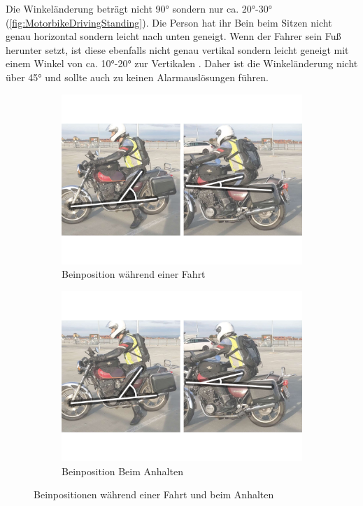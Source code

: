 Die Winkeländerung beträgt nicht \ang{90} sondern nur ca. \ang{20}-\ang{30} (\autoref{fig:MotorbikeDrivingStanding}). Die Person hat ihr Bein beim Sitzen nicht genau horizontal sondern leicht nach unten geneigt. Wenn der Fahrer sein Fuß herunter setzt, ist diese ebenfalls nicht genau vertikal sondern leicht geneigt mit einem Winkel von ca. \ang{10}-\ang{20} zur Vertikalen . Daher ist die Winkeländerung nicht über \ang{45} und sollte auch zu keinen Alarmauslösungen führen.

\begin{figure}
	\centering
	\begin{subfigure}{0.48\textwidth}
		\centering
		\includegraphics[width=\textwidth]{Bilder/0_Beinposition_Anhalten_Fahren.pdf}
		\caption{Beinposition während einer Fahrt}
		\label{fig:MotorbikeDriving}
	\end{subfigure}
	\hfill
	\begin{subfigure}{0.48\textwidth}
		\centering
		\includegraphics[width=\textwidth]{Bilder/0_Beinposition_Anhalten_Stehen.pdf}
		\caption{Beinposition Beim Anhalten}
		\label{fig:MotorbikeStanding2}
	\end{subfigure}
	\caption{Beinpositionen während einer Fahrt und beim Anhalten}
	\label{fig:MotorbikeDrivingStanding}
\end{figure}


 